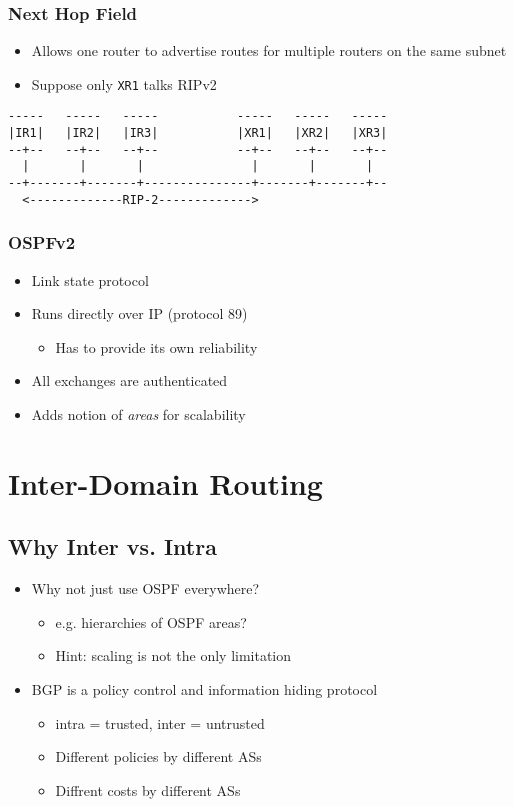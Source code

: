 \subsubsection{Next Hop Field}
\begin{itemize}[nosep]
    \item Allows one router to advertise routes for multiple routers on the same subnet
    \item Suppose only \texttt{XR1} talks RIPv2
\end{itemize}
\begin{verbatim}
-----   -----   -----           -----   -----   -----
|IR1|   |IR2|   |IR3|           |XR1|   |XR2|   |XR3|
--+--   --+--   --+--           --+--   --+--   --+--
  |       |       |               |       |       |
--+-------+-------+---------------+-------+-------+--
  <-------------RIP-2------------->
\end{verbatim}
\subsubsection{OSPFv2}
\begin{itemize}[nosep]
    \item Link state protocol
    \item Runs directly over IP (protocol 89)
          \begin{itemize}[nosep]
              \item Has to provide its own reliability
          \end{itemize}
    \item All exchanges are authenticated
    \item Adds notion of \emph{areas} for scalability
\end{itemize}
\section{Inter-Domain Routing}
\subsection{Why Inter vs. Intra}
\begin{itemize}[nosep]
    \item Why not just use OSPF everywhere?
          \begin{itemize}[nosep]
              \item e.g. hierarchies of OSPF areas?
              \item Hint: scaling is not the only limitation
          \end{itemize}
    \item BGP is a policy control and information hiding protocol
          \begin{itemize}[nosep]
              \item intra = trusted, inter = untrusted
              \item Different policies by different ASs
              \item Diffrent costs by different ASs
          \end{itemize}
\end{itemize}